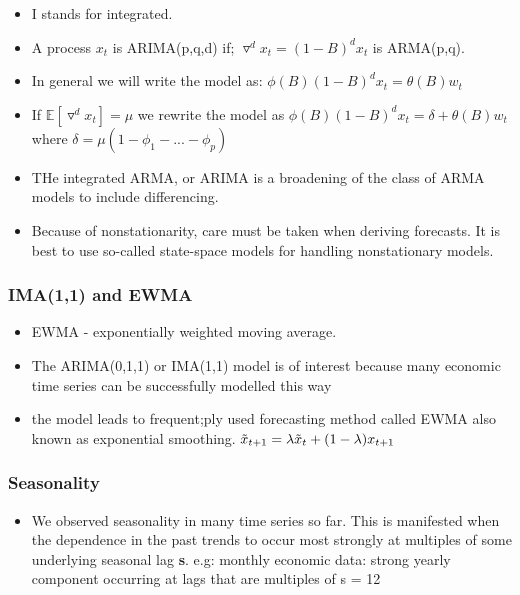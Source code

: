 \documentclass{article}
\begin{document}
\begin{itemize}
    \item I stands for integrated.
    \item A process $x_t$ is ARIMA(p,q,d) if;
    \subitem $\triangledown^d x_t = (1-B)^d x_t$ is ARMA(p,q). 
    \item In general we will write the model as:
    \subitem $\phi (B) (1 - B)^d x_t = \theta(B) w_t$
    \item If $\mathbb{E}[\triangledown^d x_t] = \mu$ we rewrite the model as
    \subitem $\phi(B) (1 - B)^d x_t = \delta + \theta(B) w_t$ where $\delta = \mu(1 - \phi_1 - ... - \phi_p)$
    \item THe integrated ARMA, or ARIMA is a broadening of the class of ARMA models to include differencing.
    \item Because of nonstationarity, care must be taken when deriving forecasts. It is best to use so-called state-space models for handling nonstationary models.
\end{itemize}


\subsubsection{IMA(1,1) and EWMA}
\begin{itemize}
    \item EWMA - exponentially weighted moving average.
    \item The ARIMA(0,1,1) or IMA(1,1) model is of interest because many economic time series can be successfully modelled this way
    \item the model leads to frequent;ply used forecasting method called EWMA also known as exponential smoothing.
    \subitem $\Tilde{x}_{t+1} = \lambda \Tilde{x}_t + (1-\lambda) x_{t+1}$
\end{itemize}

\subsubsection{Seasonality}
\begin{itemize}
    \item We observed seasonality in many time series so far. This is manifested when the dependence in the past trends to occur most strongly at multiples of some underlying seasonal lag \textbf{s}. 
    \subitem e.g: monthly economic data: strong yearly component occurring at lags that are multiples of s = 12
\end{itemize}
\end{document}
